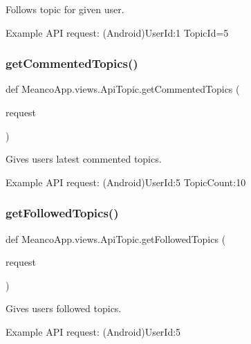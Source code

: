 Follows topic for given user. 

Example A\+PI request\+: (Android)User\+Id\+:1 Topic\+Id=5 \hypertarget{namespace_meanco_app_1_1views_1_1_api_topic_ab2f53fc783135ceb0d4ce3ddeca5989c}{}\label{namespace_meanco_app_1_1views_1_1_api_topic_ab2f53fc783135ceb0d4ce3ddeca5989c} 
\subsubsection{\texorpdfstring{get\+Commented\+Topics()}{getCommentedTopics()}}
{\footnotesize\ttfamily def Meanco\+App.\+views.\+Api\+Topic.\+get\+Commented\+Topics (\begin{DoxyParamCaption}\item[{}]{request }\end{DoxyParamCaption})}



Gives users latest commented topics. 

Example A\+PI request\+: (Android)User\+Id\+:5 Topic\+Count\+:10 \hypertarget{namespace_meanco_app_1_1views_1_1_api_topic_a72ded810f583e39ba21b8bd1b7dbc05e}{}\label{namespace_meanco_app_1_1views_1_1_api_topic_a72ded810f583e39ba21b8bd1b7dbc05e} 
\subsubsection{\texorpdfstring{get\+Followed\+Topics()}{getFollowedTopics()}}
{\footnotesize\ttfamily def Meanco\+App.\+views.\+Api\+Topic.\+get\+Followed\+Topics (\begin{DoxyParamCaption}\item[{}]{request }\end{DoxyParamCaption})}



Gives users followed topics. 

Example A\+PI request\+: (Android)User\+Id\+:5 \hypertarget{namespace_meanco_app_1_1views_1_1_api_topic_a467915c3cd43b22d8c3926eb8757e987}{}\label{namespace_meanco_app_1_1views_1_1_api_topic_a467915c3cd43b22d8c3926eb8757e987} 
